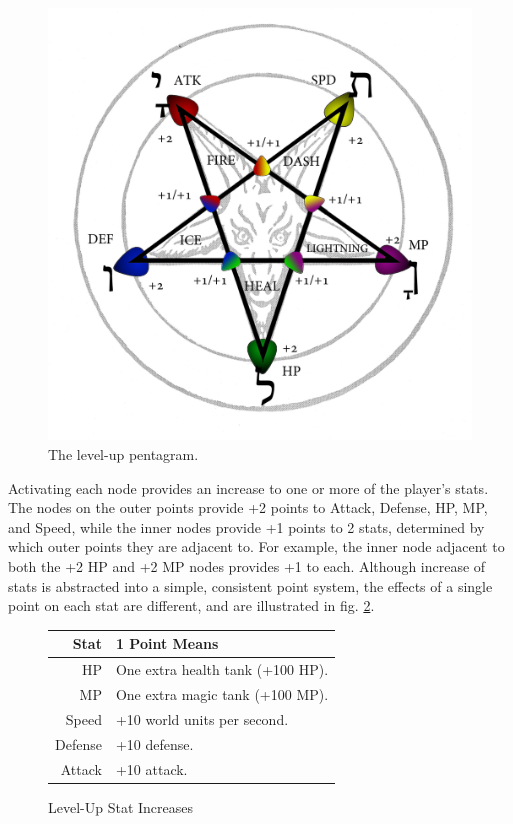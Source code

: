 \documentclass{article}
\begin{document}
\begin{figure}[h!]

\includegraphics[width=5in]{Graphics/LevelupPentagram.png}
\caption{The level-up pentagram.}
\label{Pentagram}

\end{figure}


Activating each node provides an increase to one or more of the player's stats.  The nodes on the outer points provide +2 points to Attack, Defense, HP, MP, and Speed, while the inner nodes provide +1 points to 2 stats, determined by which outer points they are adjacent to.  For example, the inner node adjacent to both the +2 HP and +2 MP nodes provides +1 to each.  Although increase of stats is abstracted into a simple, consistent point system, the effects of a single point on each stat are different, and are illustrated in fig. \ref{LevelupStats}.


\begin{figure}[h!]
\begin{tabular}{|r|l|}
\hline
Stat & 1 Point Means \\
\hline
HP & One extra health tank (+100 HP). \\
MP & One extra magic tank (+100 MP). \\
Speed & +10 world units per second. \\
Defense & +10 defense. \\
Attack & +10 attack. \\
\hline
\end{tabular}
\caption{Level-Up Stat Increases}
\label{LevelupStats}
\end{figure}
\end{document}
